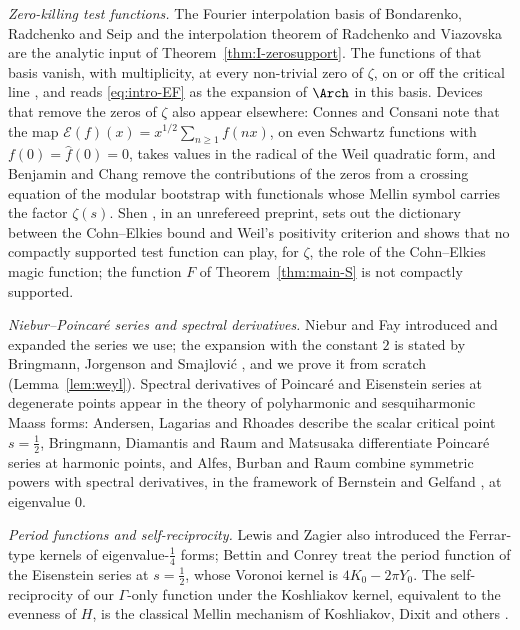 \emph{Zero-killing test functions.} The Fourier interpolation basis of Bondarenko, Radchenko and Seip \cite{BRS} and the interpolation theorem
of Radchenko and Viazovska \cite{RV19} are the analytic input of Theorem~\ref{thm:I-zerosupport}. The functions of that basis vanish, with
multiplicity, at every non-trivial zero of $\zeta$, on or off the critical line \cite[Theorem~1.1]{BRS}, and \cite[\S4.4]{BRS} reads
\eqref{eq:intro-EF} as the expansion of $\Arch$ in this basis. Devices that remove the zeros of $\zeta$ also appear elsewhere: Connes and
Consani \cite{CC23} note that the map $\mathcal E(f)(x)=x^{1/2}\sum_{n\ge1}f(nx)$, on even Schwartz functions with $f(0)=\widehat f(0)=0$, takes
values in the radical of the Weil quadratic form, and Benjamin and Chang \cite{BeCh22} remove the contributions of the zeros from a crossing
equation of the modular bootstrap with functionals whose Mellin symbol carries the factor $\zeta(s)$. Shen \cite{She26}, in an unrefereed
preprint, sets out the dictionary between the Cohn--Elkies bound and Weil's positivity criterion and shows that no compactly supported test
function can play, for $\zeta$, the role of the Cohn--Elkies magic function; the function $F$ of Theorem~\ref{thm:main-S} is not compactly
supported.

\emph{Niebur--Poincar\'e series and spectral derivatives.} Niebur \cite{Nie73} and Fay \cite{Fay77} introduced and expanded the series we use; the
expansion with the constant $2$ is stated by Bringmann, Jorgenson and Smajlovi\'c \cite[\S2.4]{BJS25}, and we prove it from scratch
(Lemma~\ref{lem:weyl}). Spectral derivatives of Poincar\'e and Eisenstein series at degenerate points appear in the theory of polyharmonic and
sesquiharmonic Maass forms: Andersen, Lagarias and Rhoades \cite[Theorem~1.1]{ALR18} describe the scalar critical point $s=\frac12$, Bringmann,
Diamantis and Raum \cite{BDR13} and Matsusaka \cite{Mat20} differentiate Poincar\'e series at harmonic points, and Alfes, Burban and Raum
\cite{ABR25} combine symmetric powers with spectral derivatives, in the framework of Bernstein and Gelfand \cite{BG80}, at eigenvalue $0$.

\emph{Period functions and self-reciprocity.} Lewis and Zagier \cite{LZ01} also introduced the Ferrar-type kernels of
eigenvalue-$\frac14$ forms; Bettin and Conrey \cite{BC13} treat the period function of the Eisenstein
series at $s=\frac12$, whose Voronoi kernel is $4K_0-2\pi Y_0$. The self-reciprocity of our $\Gamma$-only function under the Koshliakov kernel,
equivalent to the evenness of $H$, is the classical Mellin mechanism of Koshliakov, Dixit and others \cite{Kos29,Dix12,DM15,BDRZ17,DRRZ16}.

